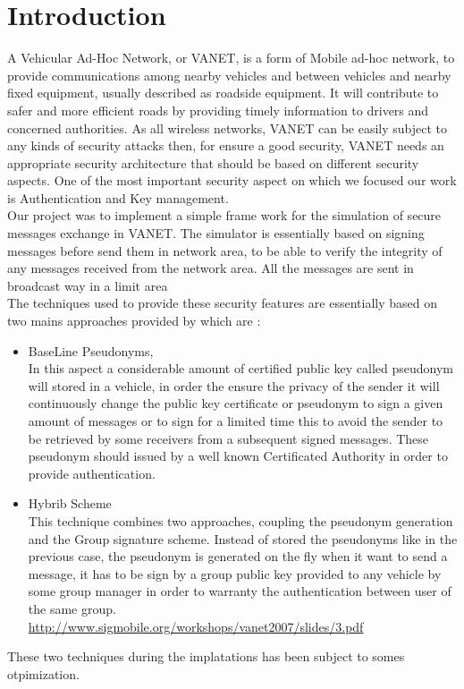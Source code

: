 \section{Introduction}
A Vehicular Ad-Hoc Network, or VANET, is a form of Mobile ad-hoc network, to provide communications among nearby vehicles and between vehicles and nearby fixed equipment, usually described as roadside equipment. It will contribute to safer and more efficient roads by providing timely information to drivers and concerned authorities.
As all wireless networks, VANET can be easily subject to any kinds of security  attacks then, for ensure a good security, VANET needs an appropriate security architecture that should be based on different security aspects. One of the most important security aspect on which we focused our work is Authentication and Key management.\\
Our project was to implement a simple frame work for the simulation of secure messages exchange in VANET. The simulator is essentially based on  signing  messages before send them in network area, to be able to verify the integrity of any messages received from the network area. All the messages are sent in broadcast way in a limit area\\
The techniques used to provide these security features are essentially based on two mains approaches provided
 by\cite{calandriello} which are :
\begin{itemize}
\item BaseLine Pseudonyms,\\
In this aspect a considerable amount of certified public key called pseudonym  will stored in a vehicle, in order the ensure the privacy of the sender it will continuously change the public key certificate or pseudonym to sign a given amount of messages or to sign for a limited time this to avoid the sender to be retrieved by some receivers from a subsequent signed messages. These pseudonym should issued by a well known Certificated Authority in order to provide authentication.

\item Hybrib Scheme\\
This technique combines two approaches, coupling the pseudonym generation and the Group signature scheme.
Instead of stored the pseudonyms like in the previous case, the pseudonym  is generated on the fly when it want to send a message, it has to be sign by a group public key provided to any vehicle by some group manager in order to warranty the authentication between user of the same group.
\\
\url{http://www.sigmobile.org/workshops/vanet2007/slides/3.pdf}
\end{itemize}
These two techniques during the implatations has been subject to somes otpimization.

